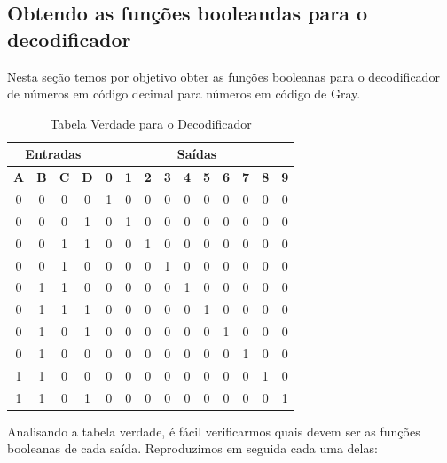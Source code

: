 \documentclass[12pt]{article}
\begin{document}
\subsection{Obtendo as funções booleandas para o decodificador}\label{sec:boolean_functions_decoder}

Nesta seção temos por objetivo obter as funções booleanas para o decodificador
de números em código decimal para números em código de Gray.

\begin{table}[H]
    \centering
    \caption{Tabela Verdade para o Decodificador}
    \begin{tabular}{|c|c|c|c||c|c|c|c|c|c|c|c|c|c|}\hline
    \multicolumn{4}{|c||}{Entradas} & \multicolumn{10}{|c|}{Saídas} \\\hline
    \textbf{A} & \textbf{B} & \textbf{C} & \textbf{D} & \textbf{0} & \textbf{1} & \textbf{2} & \textbf{3} & \textbf{4} & \textbf{5} & \textbf{6} & \textbf{7} & \textbf{8} & \textbf{9} \\\hline
    0 & 0 & 0 & 0 & 1 & 0 & 0 & 0 & 0 & 0 & 0 & 0 & 0 & 0 \\\hline
    0 & 0 & 0 & 1 & 0 & 1 & 0 & 0 & 0 & 0 & 0 & 0 & 0 & 0 \\\hline
    0 & 0 & 1 & 1 & 0 & 0 & 1 & 0 & 0 & 0 & 0 & 0 & 0 & 0 \\\hline
    0 & 0 & 1 & 0 & 0 & 0 & 0 & 1 & 0 & 0 & 0 & 0 & 0 & 0 \\\hline
    0 & 1 & 1 & 0 & 0 & 0 & 0 & 0 & 1 & 0 & 0 & 0 & 0 & 0 \\\hline
    0 & 1 & 1 & 1 & 0 & 0 & 0 & 0 & 0 & 1 & 0 & 0 & 0 & 0 \\\hline
    0 & 1 & 0 & 1 & 0 & 0 & 0 & 0 & 0 & 0 & 1 & 0 & 0 & 0 \\\hline
    0 & 1 & 0 & 0 & 0 & 0 & 0 & 0 & 0 & 0 & 0 & 1 & 0 & 0 \\\hline
    1 & 1 & 0 & 0 & 0 & 0 & 0 & 0 & 0 & 0 & 0 & 0 & 1 & 0 \\\hline
    1 & 1 & 0 & 1 & 0 & 0 & 0 & 0 & 0 & 0 & 0 & 0 & 0 & 1 \\\hline
    \end{tabular}\label{tab:tabela_and}
\end{table}

Analisando a tabela verdade, é fácil verificarmos quais devem ser as funções
booleanas de cada saída. Reproduzimos em seguida cada uma delas:
\end{document}
